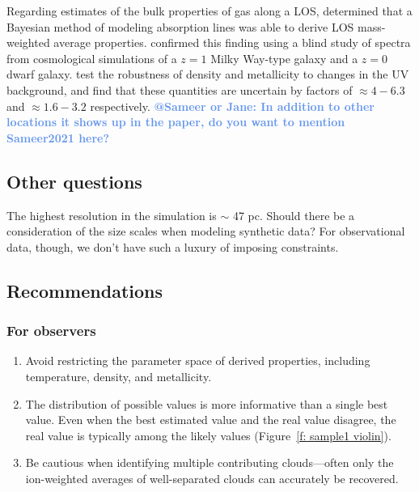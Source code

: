 \documentclass[fleqn,usenatbib]{mnras}
\makeatletter
\newcommand{\todo}[1]{\textcolor{Maroon}{\textbf{Address: #1}}}
\newcommand{\atsameer}[1]{\textcolor{CornflowerBlue}{\textbf{@Sameer or Jane: #1}}}
\makeatother
\begin{document}
Regarding estimates of the bulk properties of gas along a LOS,
\cite{Liang2018} determined that a Bayesian method of modeling absorption lines was able to derive LOS  mass-weighted average properties.
\cite{marra2021.cosmo.sims.test.observational.modeling} confirmed this finding using a blind study of spectra from cosmological simulations of a $z=1$ Milky Way-type galaxy and a $z=0$ dwarf galaxy.
\cite{Acharya2021} test the robustness of density and metallicity to changes in the UV background, and find that these quantities are uncertain by factors of $\approx 4-6.3$ and $\approx 1.6-3.2$ respectively.
\atsameer{In addition to other locations it shows up in the paper, do you want to mention Sameer2021 here?} 

\subsection{Other questions}

The highest resolution in the simulation is $\sim$ 47 pc.
Should there be a consideration of the size scales when modeling synthetic data?
For observational data, though, we don't have such a luxury of imposing constraints.

\subsection{Recommendations}

\subsubsection{For observers}

\begin{enumerate}
    \item Avoid restricting the parameter space of derived properties, including temperature, density, and metallicity. 
    \item The distribution of possible values is more informative than a single best value. Even when the best estimated value and the real value disagree, the real value is typically among the likely values (Figure~\ref{f: sample1 violin}).
    \item Be cautious when identifying multiple contributing clouds---often only the ion-weighted averages of well-separated clouds can accurately be recovered.
\end{enumerate}
\end{document}
